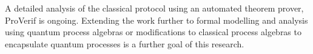 \documentclass[english]{article}
\begin{document}
A detailed analysis of the classical protocol using an automated theorem
prover, ProVerif is ongoing. Extending the work further to formal
modelling and analysis using quantum process algebras or modifications
to classical process algebras to encapsulate quantum processes is
a further goal of this research.



\end{document}
